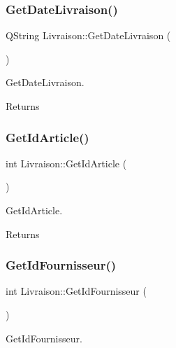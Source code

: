 \subsubsection{\texorpdfstring{Get\+Date\+Livraison()}{GetDateLivraison()}}
{\footnotesize\ttfamily Q\+String Livraison\+::\+Get\+Date\+Livraison (\begin{DoxyParamCaption}{ }\end{DoxyParamCaption})}



Get\+Date\+Livraison. 

\begin{DoxyReturn}{Returns}

\end{DoxyReturn}
\mbox{\label{class_livraison_afd597ae5578dd4d035a1f0ebb6dab560}} 
\subsubsection{\texorpdfstring{Get\+Id\+Article()}{GetIdArticle()}}
{\footnotesize\ttfamily int Livraison\+::\+Get\+Id\+Article (\begin{DoxyParamCaption}{ }\end{DoxyParamCaption})}



Get\+Id\+Article. 

\begin{DoxyReturn}{Returns}

\end{DoxyReturn}
\mbox{\label{class_livraison_abacc4cd612306dedfb785ff07f36617a}} 
\subsubsection{\texorpdfstring{Get\+Id\+Fournisseur()}{GetIdFournisseur()}}
{\footnotesize\ttfamily int Livraison\+::\+Get\+Id\+Fournisseur (\begin{DoxyParamCaption}{ }\end{DoxyParamCaption})}



Get\+Id\+Fournisseur. 

